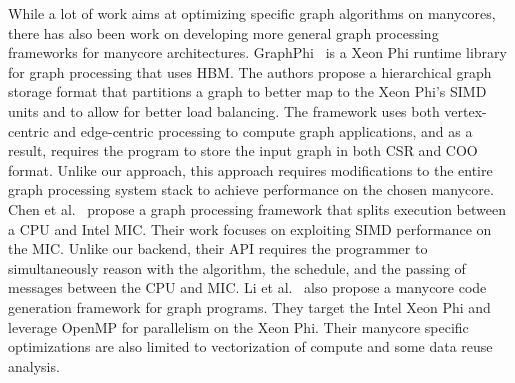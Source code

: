 While a lot of work aims at optimizing specific graph algorithms on manycores, there has also been work on developing more general graph processing frameworks for manycore architectures.
GraphPhi~\cite{peng2018graphphi} is a Xeon Phi runtime library for graph processing that uses HBM. 
The authors propose a hierarchical graph storage format that partitions a graph to better map to the Xeon Phi's SIMD units and to allow for better load balancing.
The framework uses both vertex-centric and edge-centric processing to compute graph applications, and as a result, requires the program to store the input graph in both CSR and COO format.
Unlike our approach, this approach requires modifications to the entire graph processing system stack to achieve performance on the chosen manycore.
Chen et al.~\cite{chen2015efficient} propose a graph processing framework that splits execution between a CPU and Intel MIC. 
Their work focuses on exploiting SIMD performance on the MIC. 
Unlike our \graphit backend, their API requires the programmer to simultaneously reason with the algorithm, the schedule, and the passing of messages between the CPU and MIC.
Li et al.~\cite{li2014grapid} also propose a manycore code generation framework for graph programs. 
They target the Intel Xeon Phi and leverage OpenMP for parallelism on the Xeon Phi. 
Their manycore specific optimizations are also limited to vectorization of compute and some data reuse analysis.
